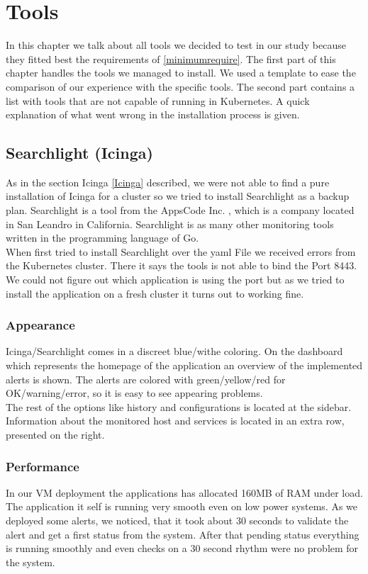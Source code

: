  
\chapter{Tools} 
In this chapter we talk about all tools we decided to test in our study because they fitted best the requirements of \cref{minimumrequire}. The first part of this chapter handles the tools we managed to install. We used a template to ease the comparison of our experience with the specific tools. The second part contains a list with tools that are not capable of running in Kubernetes. A quick explanation of what went wrong in the installation process is given.


\section{Searchlight (Icinga)}
\label{searchlight}
As in the section Icinga \ref{Icinga} described, we were not able to find a pure installation of Icinga for a cluster so we tried to install Searchlight as a backup plan.
Searchlight is a tool from the AppsCode Inc. \cite{appscode}, which is a company located in San Leandro  in California. 
Searchlight is as many other monitoring tools written in the programming language of Go.
\\
When first tried to install Searchlight over the yaml File we received errors from the Kubernetes cluster. There it says the tools is not able to bind the Port 8443. We could not figure out which application is using the port but as we tried to install the application on a fresh cluster it turns out to working fine.
\subsection{Appearance}
Icinga/Searchlight comes in a  discreet blue/withe coloring. On the dashboard which represents the homepage of the application an overview of the implemented alerts is shown. The alerts are colored with green/yellow/red for OK/warning/error, so it is easy to see appearing problems.\\
 The rest of the options like history and configurations is located at the sidebar. Information about the monitored host and services is located in an extra row, presented on the right.
\subsection{Performance}
In our VM deployment the applications has allocated 160MB of RAM under load. The application it self is running very smooth even on low power systems. As we deployed some alerts, we noticed, that it took about 30 seconds to validate the alert and get a first status from the system. After that pending status everything is running smoothly and even checks on a 30 second rhythm were no problem for the system.
